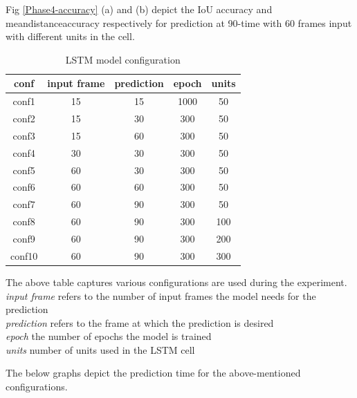 Fig \ref{Phase4-accuracy} (a) and (b) depict the IoU accuracy and mean\textunderscore distance\textunderscore accuracy respectively for prediction at 90-time with 60 frames input with different units in the cell. 


\begin {table}[H]
\begin{center}
 \begin{tabular}{||c c c c c||} 
 \hline
conf & input frame & prediction & epoch & units\\ [1.0ex] 
\hline\hline
conf1 & 15 & 15 & 1000 & 50 \\ 
\hline
conf2 & 15 & 30 & 300 & 50 \\ 
\hline
conf3 & 15 & 60 & 300 & 50 \\ 
\hline
conf4 & 30 & 30 & 300 & 50 \\ 
\hline
conf5 & 60 & 30 & 300 & 50 \\ 
\hline
conf6 & 60 & 60 & 300 & 50 \\ 
\hline
conf7 & 60 & 90 & 300 & 50 \\ 
\hline
conf8 & 60 & 90 & 300 & 100 \\ 
\hline
conf9 & 60 & 90 & 300 & 200 \\ 
\hline
conf10 & 60 & 90 & 300 & 300 \\ 
\hline
\end{tabular}
\caption{LSTM model configuration}
\end{center}
\end{table}
The above table captures various configurations are used during the experiment. \\
\textit{input frame} refers to the number of input frames the model needs for the prediction \\
\textit{prediction} refers to the frame at which the prediction is desired \\
\textit{epoch } the number of epochs the model is trained \\
\textit{units} number of units used in the LSTM cell

The below graphs depict the prediction time for the above-mentioned configurations.

